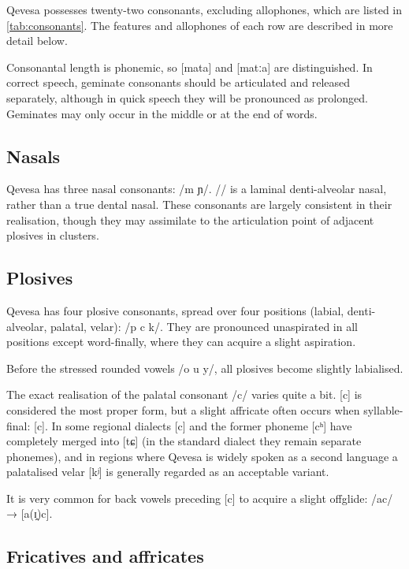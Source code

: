 \documentclass[grammar]{subfiles}
\begin{document}
Qevesa possesses twenty-two consonants, excluding allophones, which are
listed in \cref{tab:consonants}.  The features and allophones of each row are
described in more detail below.

Consonantal length is phonemic, so [mata] and [matːa] are distinguished.  In
correct speech, geminate consonants should be articulated and released
separately, although in quick speech they will be pronounced as prolonged.
Geminates may only occur in the middle or at the end of words.


\subsection{Nasals}
\label{ssec:nasals}

Qevesa has three nasal consonants: /m  ɲ/.  // is a laminal
denti-alveolar nasal, rather than a true dental nasal.  These consonants are
largely consistent in their realisation, though they may assimilate to the
articulation point of adjacent plosives in clusters. 


\subsection{Plosives}
\label{ssec:plosives}

Qevesa has four plosive consonants, spread over four positions (labial,
denti-alveolar, palatal, velar): /p  c k/. They are pronounced
unaspirated in all positions except word-finally, where they can acquire
a slight aspiration.

Before the stressed rounded vowels /o u y/, all plosives become slightly
labialised.

The exact realisation of the palatal consonant /c/ varies quite a bit. [c] is
considered the most proper form, but a slight affricate often occurs when
syllable-final: [c]. In some regional dialects [c] and the former
phoneme [cʰ] have completely merged into [tɕ] (in the standard dialect they
remain separate phonemes), and in regions where Qevesa is widely spoken as a
second language a palatalised velar [kʲ] is generally regarded as an acceptable
variant.

It is very common for back vowels preceding [c] to acquire a slight offglide:
/ac/ → [a(ɪ̯)c].


\subsection{Fricatives and affricates}
\label{ssec:fricatives}
\end{document}
